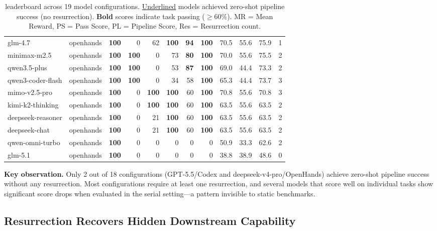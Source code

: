 \begin{table}[t]
{\begin{tabular}{llrrrrrrrrrr}
glm-4.7 & openhands & \textbf{100} & 0 & 62 & \textbf{100} & \textbf{94} & \textbf{100} & 70.5 & 55.6 & 75.9 & 1 \\
minimax-m2.5 & openhands & \textbf{100} & \textbf{100} & 0 & 73 & \textbf{80} & \textbf{100} & 70.0 & 55.6 & 75.5 & 2 \\
qwen3.5-plus & openhands & \textbf{100} & \textbf{100} & 0 & 53 & \textbf{87} & \textbf{100} & 69.0 & 44.4 & 73.3 & 2 \\
qwen3-coder-flash & openhands & \textbf{100} & \textbf{100} & 0 & 34 & 58 & \textbf{100} & 65.3 & 44.4 & 73.7 & 3 \\
mimo-v2.5-pro & openhands & \textbf{100} & 0 & \textbf{100} & \textbf{100} & 60 & \textbf{100} & 70.8 & 55.6 & 70.8 & 3 \\
kimi-k2-thinking & openhands & \textbf{100} & 0 & \textbf{100} & \textbf{100} & 60 & \textbf{100} & 63.5 & 55.6 & 63.5 & 2 \\
deepseek-reasoner & openhands & \textbf{100} & 0 & 21 & \textbf{100} & 60 & \textbf{100} & 63.5 & 55.6 & 63.5 & 2 \\
deepseek-chat & openhands & \textbf{100} & 0 & 21 & \textbf{100} & 60 & \textbf{100} & 63.5 & 55.6 & 63.5 & 2 \\
qwen-omni-turbo & openhands & \textbf{100} & 0 & 0 & 0 & 0 & 0 & 50.9 & 33.3 & 62.6 & 2 \\
glm-5.1 & openhands & \textbf{100} & 0 & 0 & 0 & 0 & 0 & 38.8 & 38.9 & 48.6 & 0 \\
\bottomrule
\end{tabular}}
\caption{\eva{} leaderboard across 19 model configurations. \underline{Underlined} models achieved zero-shot pipeline success (no resurrection). \textbf{Bold} scores indicate task passing ($\geq 60\%$). MR = Mean Reward, PS = Pass Score, PL = Pipeline Score, Res = Resurrection count.}
\label{tab:main}
\end{table}

\textbf{Key observation.}
Only 2 out of 18 configurations (GPT-5.5/Codex and deepseek-v4-pro/OpenHands) achieve zero-shot pipeline success without any resurrection.
Most configurations require at least one resurrection, and several models that score well on individual tasks show significant score drops when evaluated in the serial setting---a pattern invisible to static benchmarks.

\subsection{Resurrection Recovers Hidden Downstream Capability}

